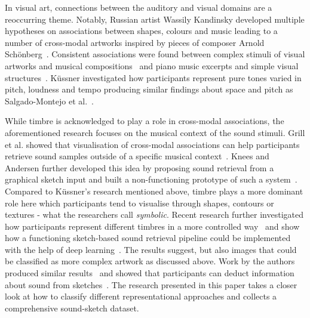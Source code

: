 \documentclass[]{interact}
\theoremstyle{plain}%
\theoremstyle{definition}
\theoremstyle{remark}
\begin{document}
In visual art, connections between the auditory and visual domains are a reoccurring theme. Notably, Russian artist Wassily Kandinsky developed multiple hypotheses on associations between shapes, colours and music leading to a number of cross-modal artworks inspired by pieces of composer Arnold Sch{\"o}nberg~\cite{}. Consistent associations were found between complex stimuli of visual artworks and musical compositions~\cite{painting&spanish_music_paper} and piano music excerpts and simple visual structures~\cite{clemente2020set}. K{\"u}ssner investigated how participants represent pure tones varied in pitch, loudness and tempo producing similar findings about space and pitch as Salgado-Montejo et al.~\cite{}. 

While timbre is acknowledged to play a role in cross-modal associations, the aforementioned research focuses on the musical context of the sound stimuli. Grill et al. showed that visualisation of cross-modal associations can help participants retrieve sound samples outside of a specific musical context~\cite{grillVisualizationPerceptualQualities2012}. Knees and Andersen further developed this idea by proposing sound retrieval from a graphical sketch input and built a non-functioning prototype of such a system~\cite{kneesSearchingAudioSketching2016}. Compared to K{\"u}ssner's research mentioned above, timbre plays a more dominant role here which participants tend to visualise through shapes, contours or textures - what the researchers call \textit{symbolic}. Recent research further investigated how participants represent different timbres in a more controlled way~\cite{engelnCoHEARenceAudibleShapes2020} and show how a functioning sketch-based sound retrieval pipeline could be implemented with the help of deep learning~\cite{engeln2021similarity}. The results suggest, but also images that could be classified as more complex artwork as discussed above. Work by the authors produced similar results~\cite{icmc2021} and showed that participants can deduct information about sound from sketches~\cite{icmc2022}. The research presented in this paper takes a closer look at how to classify different representational approaches and collects a comprehensive sound-sketch dataset.  

\end{document}
